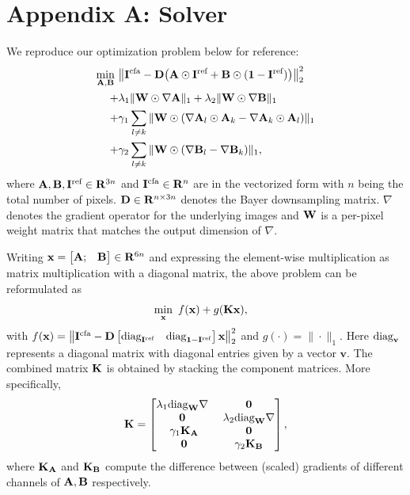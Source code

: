 \section*{Appendix A: Solver}
	We reproduce our optimization problem below for reference:
\begin{equation}
	\begin{aligned}
	\min_{\mathbf{A}, \mathbf{B}} ~ &\big\| \mathbf{I^{\text{cfa}}}-\mathbf{D}\big(\mathbf{A} \odot \mathbf{I^{\textrm{ref}}}+ \mathbf{B} \odot (\mathbf{1}-\mathbf{I^{\textrm{ref}}})\big) \big\|_2^2 \\
	+ &\lambda_{1} \|\mathbf{W}\odot\nabla\mathbf{A}\|_{1} + \lambda_{2} \|\mathbf{W}\odot\nabla\mathbf{B}\|_{1}  \\
	+ &\gamma_{1}\sum_{l\neq k}\| \mathbf{W}\odot(\nabla\mathbf{A}_{l}\odot \mathbf{A}_{k} - \nabla\mathbf{A}_{k}\odot \mathbf{A}_{l}) \|_1 \\
	+ &\gamma_{2}\sum_{l\neq k}\| \mathbf{W}\odot(\nabla\mathbf{B}_{l} - \nabla\mathbf{B}_{k}) \|_1,
	\end{aligned}
\end{equation}
where $\mathbf{A}, \mathbf{B}, \mathbf{I^{\textrm{ref}}} \in \mathbf{R}^{3n}$ and $\mathbf{I^{\text{cfa}}} \in \mathbf{R}^{n}$ are in the vectorized form with $n$ being the total number of pixels. $\mathbf{D} \in \mathbf{R}^{n\times 3n}$ denotes the Bayer downsampling matrix. $\nabla$ denotes the gradient operator for the underlying images and $\mathbf{W}$ is a per-pixel weight matrix that matches the output dimension of $\nabla$. 
	
Writing $\mathbf{x} = \begin{bmatrix}
\mathbf{A}; & \mathbf{B}
\end{bmatrix} \in \mathbf{R}^{6n}$ and expressing the element-wise multiplication as matrix multiplication with a diagonal matrix, the above problem can be reformulated as 
\begin{equation}
\begin{aligned}
&\min_{\mathbf{x}} ~ f(\mathbf{x}) + g(\mathbf{K} \mathbf{x}),
\end{aligned}
\label{eqn:optimization}
\end{equation}
with $f(\mathbf{x}) = \big\| \mathbf{I^{\text{cfa}}}-\mathbf{D} \begin{bmatrix}
\text{diag}_{\mathbf{I^{\textrm{ref}}}} \quad  \text{diag}_{\mathbf{1}-\mathbf{I^{\textrm{ref}}}}
\end{bmatrix} \mathbf{x}   \big\|_2^2$ and $g(\cdot) = \big\| \cdot \big\|_{1}$. Here $\text{diag}_{\mathbf{v}}$ represents a diagonal matrix with diagonal entries given by a vector $\mathbf{v}$. The combined matrix $\mathbf{K}$ is obtained by stacking the component matrices. More specifically, 
 \begin{equation}
\mathbf{K} = \begin{bmatrix}
\lambda_{1}\text{diag}_{\mathbf{W}}\nabla~ &  \mathbf{0} \\
\mathbf{0}~ &  \lambda_{2}\text{diag}_{\mathbf{W}}\nabla \\
\gamma_{1} \mathbf{K_{A}} &  \mathbf{0} \\
\mathbf{0} &  \gamma_{2} \mathbf{K_{B}}
\end{bmatrix},
\end{equation}
where $\mathbf{K_{A}}$ and $\mathbf{K_{B}}$ compute the difference between (scaled) gradients of different channels of $\mathbf{A}, \mathbf{B}$ respectively.
	

